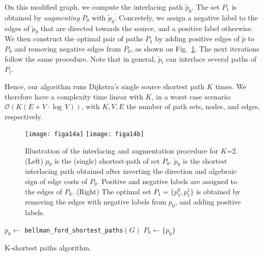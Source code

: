 On this modified graph, we compute the interlacing path $\tilde{p}_0$. The set $P_{1}$ is obtained by {\it augmenting} $P_0$ with $\tilde{p}_0$. Concretely, we assign a negative label to the edges of $\tilde{p}_0$ that are directed towards the source, and a positive label otherwise. We then construct the optimal pair of paths $P_{1}$ by adding positive edges of $\tilde{p}$ to $P_0$ and removing negative edges from $P_0$, as shown on Fig.~\ref{fig:augment}. The next iterations follow the same procedure. Note that in general, $\tilde{p}_l$ can interlace several paths of $P_l$.

Hence, our algorithm runs Dijkstra's single source shortest path $K$ times. We therefore have a complexity time linear with $K$, \ie in a worst case scenario: $\mathcal{O} \left( K(E + V \cdot \log \, V) \right)$, with $K, V, E$ the number of path sets, nodes, and edges, respectively.

\begin{figure}[t]
\centering
\texttt{[image: figa14a]}
\texttt{[image: figa14b]}
\caption{Illustration of the interlacing and augmentation procedure for $K$=2. (Left) $p_0$ is the (single) shortest-path of set $P_0$. $\tilde{p}_0$ is the shortest interlacing path obtained after inverting the direction and algebraic sign of edge costs of $P_0$. Positive and negative labels are assigned to the edges of $P_0$. (Right) The optimal set $P_1=\{ p_1^0,p_1^1 \}$ is obtained by removing the edges with negative labels from $p_0$, and adding positive labels.}\label{fig:augment}
\end{figure}


\begin{algorithm}[t]
\DontPrintSemicolon
{}
$p_0 \gets$ \texttt{bellman\_ford\_shortest\_paths}$(G)$\;
$P_0 \gets\{p_0\} $\;
\caption{K-shortest paths algorithm.\label{alg:ksp}}
\end{algorithm}

